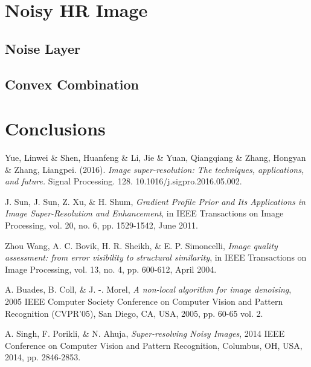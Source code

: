 \documentclass[a4paper,11pt]{article}
\begin{document}
\section{Noisy HR Image}
\subsection{Noise Layer}


\subsection{Convex Combination}


\section{Conclusions}


\begin{thebibliography}{10}

 {\sc Yue, Linwei \& Shen, Huanfeng \& Li, Jie \& Yuan, Qiangqiang \& Zhang, Hongyan \& Zhang, Liangpei.} (2016). {\em Image super-resolution: The techniques, applications, and future.} Signal Processing. 128. 10.1016/j.sigpro.2016.05.002. 

 {\sc J. Sun, J. Sun, Z. Xu, \& H. Shum}, {\em Gradient Profile Prior and Its Applications in Image Super-Resolution and Enhancement}, in IEEE Transactions on Image Processing, vol. 20, no. 6, pp. 1529-1542, June 2011.

 {\sc Zhou Wang, A. C. Bovik, H. R. Sheikh, \& E. P. Simoncelli}, {\em Image quality assessment: from error visibility to structural similarity}, in IEEE Transactions on Image Processing, vol. 13, no. 4, pp. 600-612, April 2004.

 {\sc A. Buades, B. Coll, \& J. -. Morel}, {\em A non-local algorithm for image denoising}, 2005 IEEE Computer Society Conference on Computer Vision and Pattern Recognition (CVPR'05), San Diego, CA, USA, 2005, pp. 60-65 vol. 2.

 {\sc A. Singh, F. Porikli, \& N. Ahuja}, {\em Super-resolving Noisy Images}, 2014 IEEE Conference on Computer Vision and Pattern Recognition, Columbus, OH, USA, 2014, pp. 2846-2853.

\end{thebibliography}
\end{document}
